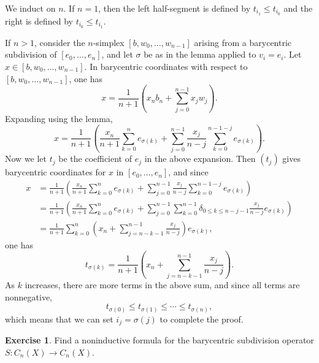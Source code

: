 \documentclass[10pt]{article}
\theoremstyle{definition}
\newtheorem{exer}{Exercise}
\begin{document}
We induct on $n$. If $n = 1$, then the left half-segment is defined by $t_{i_1} \leq t_{i_0}$ and the right is defined by $t_{i_0} \leq t_{i_1}$.

If $n > 1$, consider the $n$-simplex $[b, w_0, \dots, w_{n-1}]$ arising from a barycentric subdivision of $[e_0, \dots, e_n]$, and let $\sigma$ be as in the lemma applied to $v_i = e_i$.
Let $x \in [b, w_0, \dots, w_{n-1}]$. In barycentric coordinates with respect to $[b, w_0, \dots, w_{n-1}]$, one has
$$x = \frac{1}{n+1}\left(x_nb_n + \sum_{j=0}^{n-1} x_jw_j \right).$$
Expanding using the lemma,
$$x = \frac{1}{n+1}\left(\frac{x_n}{n+1}\sum_{k=0}^n e_{\sigma(k)} + \sum_{j=0}^{n-1} \frac{x_j}{n - j} \sum_{k=0}^{n-1-j} e_{\sigma(k)} \right).$$
Now we let $t_j$ be the coefficient of $e_j$ in the above expansion.
Then $(t_j)$ gives barycentric coordinates for $x$ in $[e_0, \dots, e_n]$, and since
\begin{align*}
x &= \frac{1}{n+1}\left(\frac{x_n}{n+1}\sum_{k=0}^n e_{\sigma(k)} + \sum_{j=0}^{n-1} \frac{x_j}{n - j} \sum_{k=0}^{n-1-j} e_{\sigma(k)} \right)\\
&= \frac{1}{n+1}\left(\frac{x_n}{n+1}\sum_{k=0}^n e_{\sigma(k)} + \sum_{j=0}^{n-1} \sum_{k=0}^{n-1} \delta_{0 \leq k \leq n-j-1} \frac{x_j}{n-j} e_{\sigma(k)}\right)\\
&= \frac{1}{n+1} \sum_{k=0}^n \left(x_n + \sum_{j=n-k-1}^{n-1} \frac{x_j}{n-j}\right) e_{\sigma(k)},
\end{align*}
one has
$$t_{\sigma(k)} = \frac{1}{n+1} \left(x_n + \sum_{j=n-k-1}^{n-1} \frac{x_j}{n-j}\right).$$
As $k$ increases, there are more terms in the above sum, and since all terms are nonnegative,
$$t_{\sigma(0)} \leq t_{\sigma(1)} \leq \cdots \leq t_{\sigma(n)},$$
which means that we can set $i_j = \sigma(j)$ to complete the proof.

\begin{exer}
Find a noninductive formula for the barycentric subdivision operator $S: C_n(X) \to C_n(X)$.
\end{exer}
\end{document}
